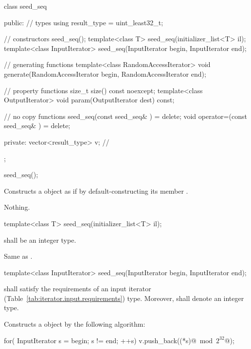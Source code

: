 %
\begin{codeblock}
class seed_seq {
public:
  // types
  using result_type = uint_least32_t;

  // constructors
  seed_seq();
  template<class T>
    seed_seq(initializer_list<T> il);
  template<class InputIterator>
    seed_seq(InputIterator begin, InputIterator end);

  // generating functions
  template<class RandomAccessIterator>
    void generate(RandomAccessIterator begin, RandomAccessIterator end);

  // property functions
  size_t size() const noexcept;
  template<class OutputIterator>
    void param(OutputIterator dest) const;

  // no copy functions
  seed_seq(const seed_seq& ) = delete;
  void operator=(const seed_seq& ) = delete;

private:
  vector<result_type> v;   // \expos
};
\end{codeblock}%


%
\begin{itemdecl}
seed_seq();
\end{itemdecl}

\begin{itemdescr}
\pnum\effects Constructs a  object
 as if by default-constructing its member .

\pnum
\throws Nothing.
\end{itemdescr}


%
\begin{itemdecl}
template<class T>
 seed_seq(initializer_list<T> il);
\end{itemdecl}

\begin{itemdescr}
\pnum\requires {} shall be an integer type.

\pnum\effects
 Same as .
\end{itemdescr}


%
\begin{itemdecl}
template<class InputIterator>
  seed_seq(InputIterator begin, InputIterator end);
\end{itemdecl}

\begin{itemdescr}
\pnum\requires
   shall satisfy the requirements
  of an input iterator (Table~\ref{tab:iterator.input.requirements}) type.
  Moreover,
  shall denote an integer type.

\pnum\effects Constructs a  object
 by the following algorithm:
\begin{codeblock}
for( InputIterator s = begin; s != end; ++s)
 v.push_back((*s)@$\bmod 2^{32}$@);
\end{codeblock}%
\end{itemdescr}

